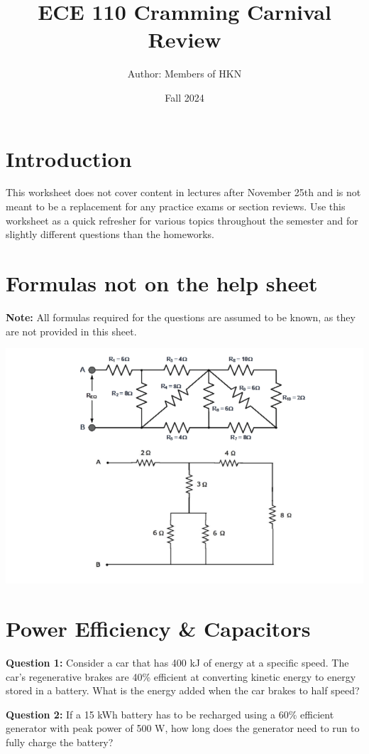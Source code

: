 \documentclass{article}
\begin{document}
\title{ECE 110 Cramming Carnival Review}
\author{Author: Members of HKN}
\date{Fall 2024}
\maketitle

\section*{Introduction}
This worksheet does not cover content in lectures after November 25th and is not meant to be a replacement for any practice exams or section reviews. Use this worksheet as a quick refresher for various topics throughout the semester and for slightly different questions than the homeworks.

\section*{Formulas not on the help sheet}
\textbf{Note:} All formulas required for the questions are assumed to be known, as they are not provided in this sheet.
\begin{center}
    \includegraphics[width=0.75\linewidth]{figures/image.png}
\end{center}
\newpage

\section*{Power Efficiency \& Capacitors}
\textbf{Question 1:} Consider a car that has 400 kJ of energy at a specific speed. The car's regenerative brakes are 40\% efficient at converting kinetic energy to energy stored in a battery. What is the energy added when the car brakes to half speed?



\textbf{Question 2:} If a 15 kWh battery has to be recharged using a 60\% efficient generator with peak power of 500 W, how long does the generator need to run to fully charge the battery?
\end{document}

